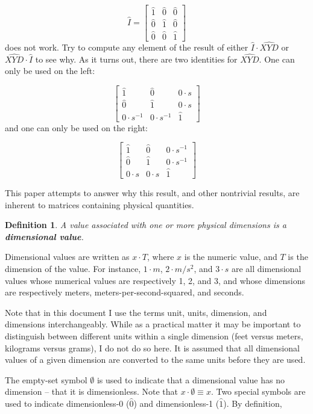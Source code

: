 \documentclass[10pt,letterpaper]{article}
\newtheorem{defn}{Definition}[section]
\numberwithin{equation}{section}
\begin{document}
\[ \hat I = \left[ \begin{matrix} 
  \hat 1 & \hat 0 & \hat 0 \\
  \hat 0 & \hat 1 & \hat 0 \\
  \hat 0 & \hat 0 & \hat 1
 \end{matrix} \right] \] does not work.  Try to compute any element of
the result of either $\hat I \cdot \widehat{XYD}$ or $\widehat{XYD}
\cdot \hat I$ to see why.  As it turns out, there are two identities
for $\widehat{XYD}$.  One can only be used on the left:
 
 \[ \left[ \begin{matrix} 
  \hat 1 & \hat 0 & 0 \cdot s \\
  \hat 0 & \hat 1 & 0 \cdot s \\
  0 \cdot s^{-1} & 0 \cdot s^{-1} & \hat 1
 \end{matrix} \right] \] and one can only be used on the right:

\[ \left[ \begin{matrix} 
  \hat 1 & \hat 0 & 0 \cdot s^{-1} \\
  \hat 0 & \hat 1 & 0 \cdot s^{-1} \\
  0 \cdot s & 0 \cdot s & \hat 1
 \end{matrix} \right] \]
 
This paper attempts to answer why this result, and other nontrivial
results, are inherent to matrices containing physical quantities.

\begin{defn} A value associated with one or more physical dimensions
  is a \textbf{dimensional value}. \end{defn}

Dimensional values are written as $x \cdot T$, where $x$ is the
numeric value, and $T$ is the dimension of the value.  For instance,
$1 \cdot m$, $2 \cdot m/s^2$, and $3 \cdot s$ are all dimensional
values whose numerical values are respectively 1, 2, and 3, and whose
dimensions are respectively meters, meters-per-second-squared, and
seconds.
 
Note that in this document I use the terms unit, units, dimension, and
dimensions interchangeably.  While as a practical matter it may be
important to distinguish between different units within a single
dimension (feet versus meters, kilograms versus grams), I do not do so
here.  It is assumed that all dimensional values of a given dimension
are converted to the same units before they are used.
 
The empty-set symbol $\emptyset$ is used to indicate that a
dimensional value has no dimension – that it is dimensionless.  Note
that $x \cdot \emptyset \equiv x$.  Two special symbols are used to
indicate dimensionless-0 ($\hat 0$) and dimensionless-1 ($\hat 1$).
By definition,
 
\end{document}
